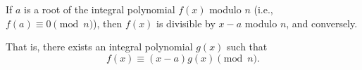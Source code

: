 If $a$ is a root of the integral polynomial $f(x)$ modulo $n$ (i.e., $f(a) \equiv 0 \pmod{n}$), then $f(x)$ is divisible by $x - a$ modulo $n$, and conversely.

That is, there exists an integral polynomial $g(x)$ such that
$$f(x) \equiv (x - a) g(x) \pmod{n}.$$
